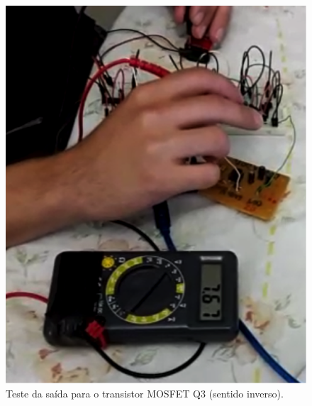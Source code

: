 \begin{anexosenv}
      \begin{figure}
          \begin{center}
              \includegraphics{figuras/teste_alimentacao_4.png}
          \end{center}
          \caption{Teste da saída para o transistor MOSFET Q3 (sentido inverso).}
          \label{fig:teste_alimentacao_4.png}
      \end{figure}


\end{anexosenv}
